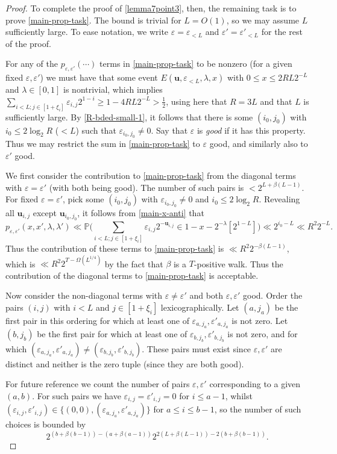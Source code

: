\documentclass[11pt,reqno]{amsart}
\numberwithin{equation}{section}
\theoremstyle{definition}
\theoremstyle{remark}
\newcommand{\mb}{\mathbb}
\newcommand{\mbf}{\mathbf}
\newcommand{\eps}{\varepsilon}
\renewcommand{\le}{\leqslant}
\renewcommand{\ge}{\geqslant}
\begin{document}
\begin{proof}
To complete the proof of \cref{lemma7point3}, then, the remaining task is to prove \cref{main-prop-task}. The bound is trivial for $L = O(1)$, so we may assume $L$ sufficiently large. To ease notation, we write $\eps = \eps_{< L}$ and $\eps' = \eps'_{< L}$ for the rest of the proof.

For any of the $p_{\eps,\eps'}(\cdots)$ terms in \cref{main-prop-task} to be nonzero (for a given fixed $\eps, \eps'$) we must have that some event $E(\mbf{u}, \eps_{< L}, \lambda, x)$ with $0 \le x \le 2R L 2^{-L}$ and $\lambda \in [0,1]$ is nontrivial, which implies $\sum_{i < L; j \in [1 + \xi_i]} \eps_{i,j} 2^{1-i} \ge 1 - 4RL 2^{-L} > \frac{1}{2}$, using here that $R = 3L$ and that $L$ is sufficiently large. By \cref{R-bded-small-1}, it follows that there is some $(i_0, j_0)$ with $i_0 \le 2 \log_2 R$ ($< L$) such that $\eps_{i_0, j_0} \ne 0$. Say that $\eps$ is \emph{good} if it has this property. Thus we may restrict the sum in \cref{main-prop-task} to $\eps$ good, and similarly also to $\eps'$ good.


We first consider the contribution to \cref{main-prop-task} from the diagonal terms with $\eps = \eps'$ (with both being good). The number of such pairs is $< 2^{L + \beta(L-1)}$. For fixed $\eps = \eps'$, pick some $(i_0, j_0)$ with $\eps_{i_0, j_0} \ne 0$ and $i_0 \le 2 \log_2 R$. Revealing all $\mbf{u}_{i,j}$ except $\mbf{u}_{i_0,j_0}$, it follows from \cref{main-x-anti} that
\[ p_{\eps, \eps'}(x,x',\lambda, \lambda') \ll \mb{P} \big( \sum_{i < L;j \in [1 + \xi_i]} \eps_{i,j} 2^{-\mbf{u}_{i,j}} \in 1- x - 2^{-\lambda} [2^{1-L}] \big) \ll 2^{i_0 - L} \ll R^2 2^{-L}.\] Thus the contribution of these terms to \cref{main-prop-task} is $\ll R^2 2^{-\beta(L-1)}$, which is $\ll R^2 2^{T - \Omega(L^{1/4})}$ by the fact that $\beta$ is a $T$-positive walk. Thus the contribution of the diagonal terms to \cref{main-prop-task} is acceptable.

Now consider the non-diagonal terms with $\eps \ne \eps'$ and both $\eps, \eps'$ good. Order the pairs $(i,j)$ with $i < L$ and $j \in [1 + \xi_i]$ lexicographically. Let $(a, j_a)$ be the first pair in this ordering for which at least one of $\eps_{a, j_a}, \eps'_{a,j_a}$ is not zero. Let $(b, j_b)$ be the first pair for which at least one of $\eps_{b, j_b}, \eps'_{b,j_b}$ is not zero, and for which $(\eps_{a,j_a}, \eps'_{a, j_a}) \neq (\eps_{b, j_b}, \eps'_{b,j_b})$. These pairs must exist since $\eps, \eps'$ are distinct and neither is the zero tuple (since they are both good).

For future reference we count the number of pairs $\eps, \eps'$ corresponding to a given $(a,b)$. For such pairs we have $\eps_{i,j} = \eps'_{i,j} = 0$ for $i \le a - 1$, whilst 
$(\eps_{i,j}, \eps'_{i,j}) \in \{ (0,0), (\eps_{a,j_a}, \eps'_{a,j_a})\}$ for $a \le i \le b-1$, so the number of such choices is bounded by 
\begin{equation}\label{comp-W}  2^{(b + \beta(b-1)) - (a + \beta(a - 1))} 2^{2(L + \beta(L-1)) - 2(b + \beta(b-1))}.\end{equation}


\end{proof}
\end{document}
